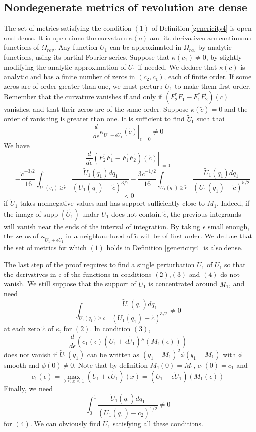 \documentclass[12pt]{amsart}
\numberwithin{equation}{subsection}
\theoremstyle{definition}
\theoremstyle{plain}
\begin{document}
\subsection{Nondegenerate metrics of revolution are dense}
The set of metrics satisfying the condition $(1)$ of Definition \ref{genericity4} is open and dense.
It is open since the curvature $\kappa(c)$ and its derivatives are continuous functions of $\Omega_{rev}$.
Any function $U_1$ can be approximated in $\Omega_{rev}$ by analytic functions, using its partial Fourier series.
Suppose that $\kappa(c_1) \neq 0$, by slightly modifying the analytic approximation of $U_1$ if needed.
We deduce that $\kappa(c)$ is analytic and has  a finite number of zeros in $(c_2,c_1)$, each of finite order. If some zeros are of order greater than one, we must perturb $U_1$ to
make them first order.
Remember that the curvature vanishes if and only if $(F_2^{''}F_1^{'} - F_1^{''}F_2^{'})(c)$ vanishes,
and that their zeros are of the same order.
Suppose $\kappa(\tilde{c})=0$ and the order of vanishing is greater than one.
It is sufficient to find $\tilde{U}_1$ such that
\[
\frac{d}{d \epsilon} \left. \kappa_{U_1+ \epsilon \tilde{U}_1}(\tilde{c}) \right|_{\epsilon=0}  \neq 0
\]
We have
\[
\frac{d}{d \epsilon} \left. (F_2^{''}F_1^{'} - F_1^{''}F_2^{'})(\tilde{c}) \right|_{\epsilon=0}
\]
\[
= -\frac{\tilde{c}^{-3/2}}{16} { \int_{U_1(q_1) \geq \tilde{c}} \frac{\tilde{U}_1 (q_1) dq_1}{(U_1(q_1) - \tilde{c})^{3/2}} }
-
\frac{3 \tilde{c}^{-1/2}}{16} { \int_{U_1(q_1) \geq \tilde{c}} \frac{\tilde{U}_1 (q_1) dq_1}{(U_1(q_1) - \tilde{c})^{5/2}} }
\]
\[
< 0
\]
if $\tilde{U}_1$ takes nonnegative values and has support sufficiently close to $M_1$.
Indeed, if the image of $\text{supp }(\tilde{U_1})$ under $U_1$ does not contain $\tilde{c}$, the
previous integrands will vanish near the ends of the interval of integration.
By taking $\epsilon$ small enough, the zeros of $\kappa_{U_1+ \epsilon \tilde{U}_1}$ in a neighbourhood
of $\tilde{c}$ will be of first order.
We deduce that the set of metrics for which $(1)$ holds in Definition \ref{genericity4} is also dense.

The last step of the proof requires to find a single perturbation $\tilde{U}_1$ of $U_1$ so that
the derivatives in $\epsilon$ of the functions in conditions $(2)$,$(3)$ and $(4)$ do not vanish.
We still suppose that the support of $\tilde{U}_1$
is concentrated around $M_1$, and need
\[
\int_{U_1(q_1) \geq \tilde{c}} \frac{\tilde{U}_1(q_1) dq_1}{(U_1(q_1)-\tilde{c})^{3/2}}
\neq 0
\]
at each zero $\tilde{c}$ of $\kappa$, for $(2)$.
In condition $(3)$,
\[
\frac{d}{d \epsilon} \left( c_1(\epsilon) (U_1+\epsilon \tilde{U}_1)''(M_1(\epsilon)) \right)
\]
does not vanish
if $\tilde{U}_1(q_1)$ can be written as $(q_1-M_1)^2\phi(q_1-M_1)$ with $\phi$ smooth and $\phi(0) \neq 0$.
Note that by definition $M_1(0)=M_1$, $c_1(0)=c_1$ and
\[
c_1(\epsilon) = \max_{0 \leq x \leq 1} (U_1+\epsilon \tilde{U}_1)(x) = (U_1+\epsilon \tilde{U}_1)(M_1(\epsilon))
\]
Finally, we need
\[
\int_0^1 \frac{\tilde{U}_1(q_1) dq_1}{(U_1(q_1)-c_2)^{1/2}}
\neq 0
\]
for $(4)$. We can obviously find $\tilde{U}_1$ satisfying all these conditions.
\end{document}
